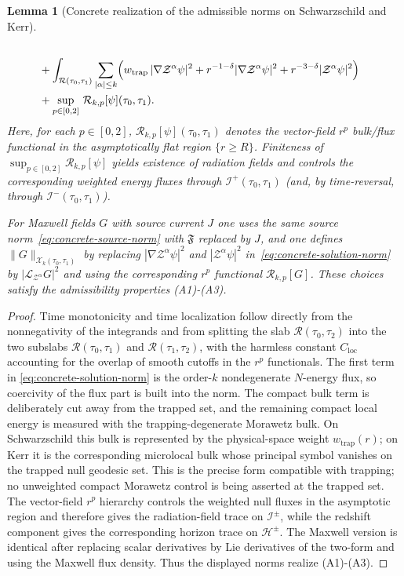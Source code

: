 \documentclass[11pt]{article}
\numberwithin{equation}{section}
\theoremstyle{plain}
\newtheorem{lemma}[theorem]{Lemma}
\theoremstyle{definition}
\theoremstyle{remark}
\begin{document}
\begin{lemma}[Concrete realization of the admissible norms on Schwarzschild and Kerr]
\begin{eqnarray}
\nonumber\\
&+
\int_{\mathcal{R}(\tau_{0},\tau_{1})}\sum_{|\alpha|\le k}\Bigl(
w_{\mathrm{trap}}\,|\nabla \mathcal Z^{\alpha}\psi|^{2}
+r^{-1-\delta}|\nabla \mathcal Z^{\alpha}\psi|^{2}
+r^{-3-\delta}|\mathcal Z^{\alpha}\psi|^{2}
\Bigr)
\nonumber\\
&+\sup_{p\in[0,2]}\,\mathcal R_{k,p}[\psi](\tau_{0},\tau_{1}).
\end{eqnarray}
Here, for each $p\in[0,2]$, $\mathcal R_{k,p}[\psi](\tau_{0},\tau_{1})$ denotes the vector-field $r^{p}$ bulk/flux functional
in the asymptotically flat region $\{r\ge R\}$.
Finiteness of $\sup_{p\in[0,2]}\mathcal R_{k,p}[\psi]$ yields existence of radiation fields and controls the corresponding weighted energy fluxes through $\mathcal I^{+}(\tau_{0},\tau_{1})$
(and, by time-reversal, through $\mathcal I^{-}(\tau_{0},\tau_{1})$).

For Maxwell fields $G$ with source current $J$ one uses the same source norm~\eqref{eq:concrete-source-norm} with $\mathfrak{F}$ replaced by $J$,
and one defines $\|G\|_{\mathcal X_{k}(\tau_{0},\tau_{1})}$ by replacing $|\nabla \mathcal Z^{\alpha}\psi|^{2}$ and $|\mathcal Z^{\alpha}\psi|^{2}$ in~\eqref{eq:concrete-solution-norm}
by $|\mathcal{L}_{\mathcal Z^{\alpha}}G|^{2}$ and using the corresponding $r^{p}$ functional $\mathcal R_{k,p}[G]$.
These choices satisfy the admissibility properties \textup{(A1)-(A3)}.
\end{lemma}

\begin{proof}
Time monotonicity and time localization follow directly from the nonnegativity of the integrands and from splitting the slab $\mathcal R(\tau_0,\tau_2)$ into the two subslabs $\mathcal R(\tau_0,\tau_1)$ and $\mathcal R(\tau_1,\tau_2)$, with the harmless constant $C_{\mathrm{loc}}$ accounting for the overlap of smooth cutoffs in the $r^p$ functionals. The first term in \eqref{eq:concrete-solution-norm} is the order-$k$ nondegenerate $N$-energy flux, so coercivity of the flux part is built into the norm. The compact bulk term is deliberately cut away from the trapped set, and the remaining compact local energy is measured with the trapping-degenerate Morawetz bulk. On Schwarzschild this bulk is represented by the physical-space weight $w_{\mathrm{trap}}(r)$; on Kerr it is the corresponding microlocal bulk whose principal symbol vanishes on the trapped null geodesic set. This is the precise form compatible with trapping; no unweighted compact Morawetz control is being asserted at the trapped set. The vector-field $r^p$ hierarchy controls the weighted null fluxes in the asymptotic region and therefore gives the radiation-field trace on $\mathcal I^\pm$, while the redshift component gives the corresponding horizon trace on $\mathcal H^\pm$. The Maxwell version is identical after replacing scalar derivatives by Lie derivatives of the two-form and using the Maxwell flux density. Thus the displayed norms realize \textup{(A1)-(A3)}.
\end{proof}
\end{document}
